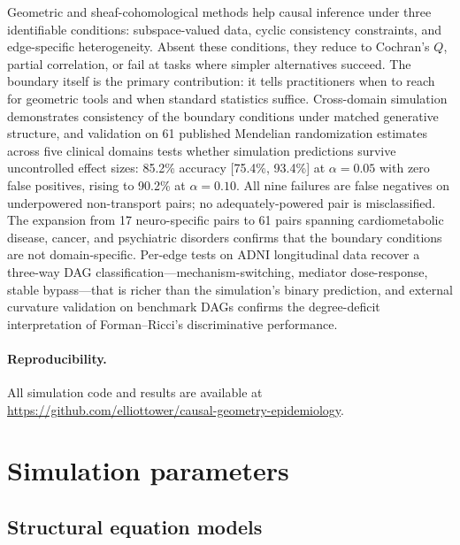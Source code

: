 \documentclass{article}
\begin{document}
Geometric and sheaf-cohomological methods help causal inference under three identifiable conditions: subspace-valued data, cyclic consistency constraints, and edge-specific heterogeneity.
Absent these conditions, they reduce to Cochran's $Q$, partial correlation, or fail at tasks where simpler alternatives succeed.
The boundary itself is the primary contribution: it tells practitioners when to reach for geometric tools and when standard statistics suffice.
Cross-domain simulation demonstrates consistency of the boundary conditions under matched generative structure, and validation on 61 published Mendelian randomization estimates across five clinical domains tests whether simulation predictions survive uncontrolled effect sizes: 85.2\% accuracy [75.4\%, 93.4\%] at $\alpha = 0.05$ with zero false positives, rising to 90.2\% at $\alpha = 0.10$.
All nine failures are false negatives on underpowered non-transport pairs; no adequately-powered pair is misclassified.
The expansion from 17 neuro-specific pairs to 61 pairs spanning cardiometabolic disease, cancer, and psychiatric disorders confirms that the boundary conditions are not domain-specific.
Per-edge tests on ADNI longitudinal data recover a three-way DAG classification---mechanism-switching, mediator dose-response, stable bypass---that is richer than the simulation's binary prediction, and external curvature validation on benchmark DAGs confirms the degree-deficit interpretation of Forman--Ricci's discriminative performance.

\paragraph{Reproducibility.}
All simulation code and results are available at \url{https://github.com/elliottower/causal-geometry-epidemiology}.




\appendix

\section{Simulation parameters}
\label{app:sim-params}

\subsection{Structural equation models}
\end{document}
